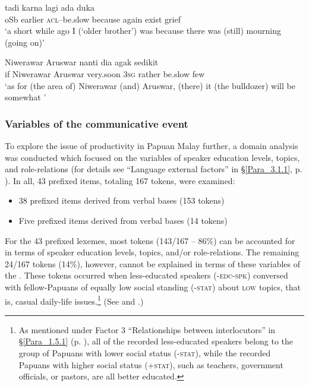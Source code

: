 \ea
\label{Example_3.8}
 {tadi} {} {karna} {lagi} {ada} {duka}\\ %
 oSb  earlier  \textsc{acl}–be.slow  because  again  exist  grief\\
\glt 
‘a short while ago I (‘older brother’) was  because there was (still) mourning (going on)’ \textstyleExampleSource{[080918-001-CvNP.0003]}
\z

\ea
\label{Example_3.9}
 {Niwerawar} {Aruswar} {nanti} {dia} {agak} {} {sedikit}\\ %
 if  Niwerawar  Aruswar  very.soon  \textsc{3sg}  rather  be.slow  few\\
 ‘as for (the area of) Niwerawar (and) Aruswar, (there) it (the bulldozer) will be somewhat ’ \textstyleExampleSource{[081006-033-Cv.0051]}
\z
\subsubsection[Variables of the {communicative event}]{Variables of the communicative event}\label{Para_3.1.2.4}

To explore the issue of productivity in Papuan Malay further, a domain analysis was conducted which focused on the variables of speaker education levels, topics, and role-relations (for details see ``Language external factors'' in §\ref{Para_3.1.1}, p. \pageref{List_3.2}). In all, 43 prefixed items, totaling 167 tokens, were examined:


\begin{itemize}
\item 
38 prefixed items derived from  verbal bases (153 tokens)
\item 
Five prefixed items derived from  verbal bases (14 tokens)
\end{itemize}

For the 43 prefixed lexemes, most tokens (143/167 – 86\%) can be accounted for in terms of speaker education levels, topics, and/or role-relations. The remaining 24/167 tokens (14\%), however, cannot be explained in terms of these variables of the . These tokens occurred when less-educated speakers (\textsc{-edc-spk}) conversed with fellow-Papuans of equally low social standing (\textsc{-stat}) about \textsc{low} topics, that is, casual daily-life issues.\footnote{As mentioned under Factor 3 ``Relationships between interlocutors'' in §\ref{Para_1.5.1} (p. \pageref{Item_1.3}), all of the recorded less-educated speakers belong to the group of Papuans with lower social status (\textsc{-stat}), while the recorded Papuans with higher social status (\textsc{+stat}), such as teachers, government officials, or pastors, are all better educated.} (See  and .)



